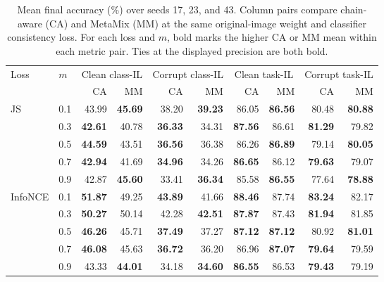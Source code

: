 \begin{table}[t]
\centering\small
\begin{tabular}{llrrrrrrrr}
\toprule
Loss & $m$ & \multicolumn{2}{c}{Clean class-IL} & \multicolumn{2}{c}{Corrupt class-IL} & \multicolumn{2}{c}{Clean task-IL} & \multicolumn{2}{c}{Corrupt task-IL} \\
 &  & CA & MM & CA & MM & CA & MM & CA & MM \\
\midrule
JS & 0.1 & 43.99 & \textbf{45.69} & 38.20 & \textbf{39.23} & 86.05 & \textbf{86.56} & 80.48 & \textbf{80.88} \\
 & 0.3 & \textbf{42.61} & 40.78 & \textbf{36.33} & 34.31 & \textbf{87.56} & 86.61 & \textbf{81.29} & 79.82 \\
 & 0.5 & \textbf{44.59} & 43.51 & \textbf{36.56} & 36.38 & 86.26 & \textbf{86.89} & 79.14 & \textbf{80.05} \\
 & 0.7 & \textbf{42.94} & 41.69 & \textbf{34.96} & 34.26 & \textbf{86.65} & 86.12 & \textbf{79.63} & 79.07 \\
 & 0.9 & 42.87 & \textbf{45.60} & 33.41 & \textbf{36.34} & 85.58 & \textbf{86.55} & 77.64 & \textbf{78.88} \\
\midrule
InfoNCE & 0.1 & \textbf{51.87} & 49.25 & \textbf{43.89} & 41.66 & \textbf{88.46} & 87.74 & \textbf{83.24} & 82.17 \\
 & 0.3 & \textbf{50.27} & 50.14 & 42.28 & \textbf{42.51} & \textbf{87.87} & 87.43 & \textbf{81.94} & 81.85 \\
 & 0.5 & \textbf{46.26} & 45.71 & \textbf{37.49} & 37.27 & \textbf{87.12} & \textbf{87.12} & 80.92 & \textbf{81.01} \\
 & 0.7 & \textbf{46.08} & 45.63 & \textbf{36.72} & 36.20 & 86.96 & \textbf{87.07} & \textbf{79.64} & 79.59 \\
 & 0.9 & 43.33 & \textbf{44.01} & 34.18 & \textbf{34.60} & \textbf{86.55} & 86.53 & \textbf{79.43} & 79.19 \\
\bottomrule
\end{tabular}
\caption{Mean final accuracy (\%) over seeds 17, 23, and 43. Column pairs compare chain-aware (CA) and MetaMix (MM) at the same original-image weight and classifier consistency loss. For each loss and $m$, bold marks the higher CA or MM mean within each metric pair. Ties at the displayed precision are both bold.}\label{tab:main}
\end{table}
